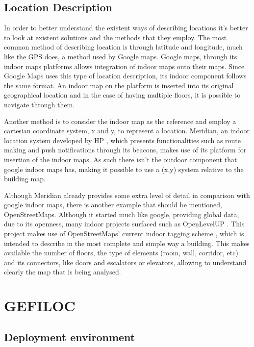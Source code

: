 \documentclass[a4paper]{IEEEtran}
\begin{document}
 
\subsection{Location Description} 
\label{subsec:description} 
 
 
In order to better understand the existent ways of describing locations it's better to look at existent solutions and the methods that they employ. The most common method of describing location is through latitude and longitude, much like the GPS does, a method used by Google maps. Google maps, through its indoor maps platforms \cite{googlemaps} allows integration of indoor maps onto their maps. Since Google Maps uses this type of location description, its indoor component follows the same format. An indoor map on the platform is inserted into its original geographical location and in the case of having multiple floors, it is possible to navigate through them. 
 
 
Another method is to consider the indoor map as the reference and employ a cartesian coordinate system, x and y, to represent a location. Meridian, an indoor location system developed by HP \cite{meridian}, which presents functionalities such as route making and push notifications through its beacons, makes use of its platform for insertion of the indoor maps. As such there isn't the outdoor component that google indoor maps has, making it possible to use a (x,y) system relative to the building map. 
 
 
Although Meridian already provides some extra level of detail in comparison with google indoor maps, there is another example that should be mentioned, OpenStreetMaps. Although it started much like google, providing global data, due to its openness, many indoor projects surfaced such as OpenLevelUP \cite{openlevel}. This project makes use of OpenStreetMaps' current indoor tagging scheme \cite{opentagging}, which is intended to describe in the most complete and simple way a building. This makes available the number of floors, the type of elements (room, wall, corridor, etc) and its connectors, like doors and escalators or elevators, allowing to understand clearly the map that is being analysed. 
 
 
\section{GEFILOC} 
\label{sec:system} 
 
 
 
 
\subsection{Deployment environment} 
\label{subsec:deployment} 
 
\end{document}
